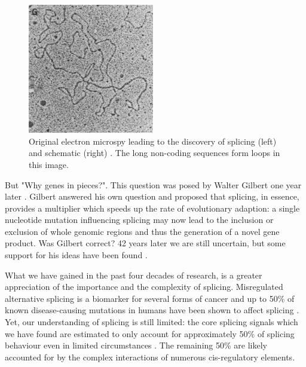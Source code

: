 \begin{figure}
	\centering
		\includegraphics[width=0.49\textwidth]{../visualizations/ch1-introduction/original_electron_microscopy.jpg}
	\caption{Original electron microspy leading to the discovery of splicing (left) and schematic (right) \cite{discoveryofsplicing}. The long non-coding sequences form loops in this image.  }
	\label{fig:discovery}
\end{figure}

But "Why genes in pieces?". This question was posed by Walter Gilbert one year later \cite{whygenesinpieces}. Gilbert answered his own question and proposed that splicing, in essence, provides a multiplier which speeds up the rate of evolutionary adaption: a single nucleotide mutation influencing splicing may now lead to the inclusion or exclusion of whole genomic regions and thus the generation of a novel gene product. Was Gilbert correct? 42 years later we are still uncertain, but some support for his ideas have been found \cite{whyrevisited}. %

What we have gained in the past four decades of research, is a greater appreciation of the importance and the complexity of splicing. 
Misregulated alternative splicing is a biomarker for several forms of cancer \cite{cancer} \cite{splicingcausescancer} and up to 50\% of known disease-causing mutations in humans have been shown to affect splicing \cite{50diseasessplicing}. 
Yet, our understanding of splicing is still limited: the core splicing signals which we have found are estimated to only account for approximately 50\% of splicing behaviour even in limited circumstances \cite{coresplicingsignals50percentexplainit}. The remaining 50\% are likely accounted for by the complex interactions of numerous cis-regulatory elements. 

